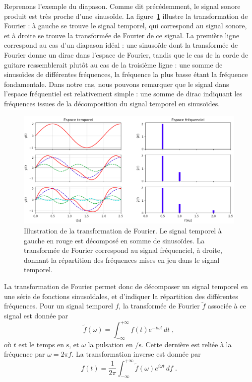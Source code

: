 Reprenons l'exemple du diapason. Comme dit précédemment, le signal sonore produit est très proche d'une sinusoïde. La figure~\ref{fig:example_tf} illustre la transformation de Fourier : à gauche se trouve le signal temporel, qui correspond au signal sonore, et à droite se trouve la transformée de Fourier de ce signal.
La première ligne correspond au cas d'un diapason idéal :
une sinusoïde dont la transformée de Fourier donne un dirac dans l'espace de Fourier, tandis que le cas de la corde de guitare ressemblerait plutôt au cas de la troisième ligne :
une somme de sinusoïdes de différentes fréquences, la fréquence la plus basse étant la fréquence fondamentale. Dans notre cas, nous pouvons remarquer que le signal dans l'espace fréquentiel est relativement simple : une somme de dirac indiquant les fréquences issues de la décomposition du signal temporel en sinusoïdes.
\begin{figure}[h]
  \centering
  \includegraphics[scale=0.5]{example_tf}
  \caption{Illustration de la transformation de Fourier. Le signal temporel à gauche en rouge est décomposé en somme de sinusoïdes. La transformée de Fourier correspond au signal fréquenciel, à droite, donnant la répartition des fréquences mises en jeu dans le signal temporel.}
  \label{fig:example_tf}
\end{figure}

La transformation de Fourier permet donc de décomposer un signal temporel en une série de fonctions sinusoïdales, et d'indiquer la répartition des différentes fréquences. Pour un signal temporel $f$, la transformée de Fourier $\tilde f$ associée à ce signal est donnée par
\begin{equation}
  \label{eq:def_tf}
  \tilde f(\omega) = \int_{-\infty}^{+\infty}f(t) e^{- i \omega t} \,dt  \; ,
\end{equation}
où $t$ est le temps en $\si{\second}$, et $\omega$ la pulsation en $\si{\per\second}$. Cette dernière est reliée à la fréquence par $\omega = 2 \pi f$. La transformation inverse est donnée par
\begin{equation}
  \label{eq:def_tf_inv}
   f(t) = \frac{1}{2 \pi}\int_{-\infty}^{+\infty} \tilde f(\omega) e^{ i \omega t} \,df  \; .
\end{equation}


